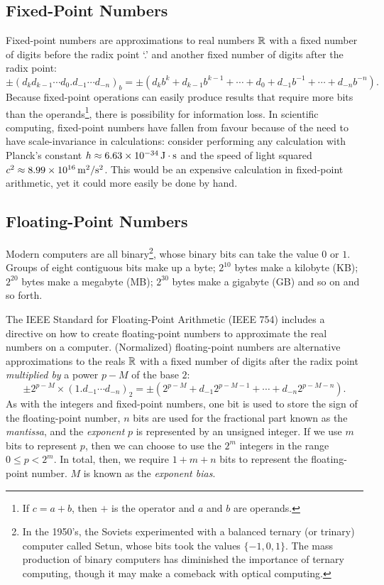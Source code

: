 \subsection{Fixed-Point Numbers}

Fixed-point numbers are approximations to real numbers $\mathbb{R}$ with a fixed number of digits before the radix point `.' and another fixed number of digits after the radix point:
\[
\pm(d_kd_{k-1}\cdots d_0.d_{-1}\cdots d_{-n})_b = \pm\left(d_kb^k + d_{k-1}b^{k-1} + \cdots + d_0 + d_{-1}b^{-1} + \cdots + d_{-n}b^{-n}\right).
\]
Because fixed-point operations can easily produce results that require more bits than the operands\footnote{If $c = a+b$, then $+$ is the operator and $a$ and $b$ are operands.}, there is possibility for information loss. In scientific computing, fixed-point numbers have fallen from favour because of the need to have scale-invariance in calculations: consider performing any calculation with Planck's constant $h \approx 6.63\times10^{-34}{\rm\,J}\cdot{\rm s}$ and the speed of light squared $c^2 \approx 8.99\times10^{16}{\rm\,m}^2/{\rm s}^2$. This would be an expensive calculation in fixed-point arithmetic, yet it could more easily be done by hand.

\subsection{Floating-Point Numbers}

Modern computers are all binary\footnote{In the 1950's, the Soviets experimented with a balanced ternary (or trinary) computer called Setun, whose bits took the values $\{-1,0,1\}$. The mass production of binary computers has diminished the importance of ternary computing, though it may make a comeback with optical computing.}, whose binary bits can take the value $0$ or $1$. Groups of eight contiguous bits make up a byte; $2^{10}$ bytes make a kilobyte (KB); $2^{20}$ bytes make a megabyte (MB); $2^{30}$ bytes make a gigabyte (GB) and so on and so forth.

The IEEE Standard for Floating-Point Arithmetic (IEEE 754) includes a directive on how to create floating-point numbers to approximate the real numbers on a computer. (Normalized) floating-point numbers are alternative approximations to the reals $\mathbb{R}$ with a fixed number of digits after the radix point {\em multiplied by} a power $p-M$ of the base $2$:
\[
\pm 2^{p-M} \times (1.d_{-1}\cdots d_{-n})_2  = \pm\left(2^{p-M} + d_{-1}2^{p-M-1} + \cdots + d_{-n}2^{p-M-n}\right).
\]
As with the integers and fixed-point numbers, one bit is used to store the sign of the floating-point number, $n$ bits are used for the fractional part known as the {\em mantissa}, and the {\em exponent} $p$ is represented by an unsigned integer. If we use $m$ bits to represent $p$, then we can choose to use the $2^m$ integers in the range $0 \le p < 2^m$. In total, then, we require $1+m+n$ bits to represent the floating-point number. $M$ is known as the {\em exponent bias}.

